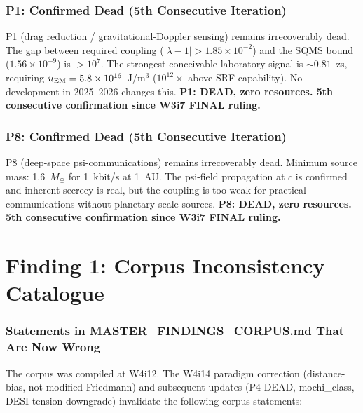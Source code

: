 \documentclass[11pt]{article}
\newcommand{\ee}[1]{\times 10^{#1}}
\newcommand{\lamdiff}{|\lambda{-}1|}
\begin{document}
\section{P1: Confirmed Dead (5th Consecutive Iteration)}

P1 (drag reduction / gravitational-Doppler sensing) remains irrecoverably
dead.  The gap between required coupling ($\lamdiff > 1.85\ee{-2}$) and
the SQMS bound ($1.56\ee{-9}$) is $>10^7$.  The strongest conceivable
laboratory signal is $\sim 0.81$~zs, requiring $u_{\rm EM} = 5.8\ee{16}$~J/m$^3$
($10^{12}\times$ above SRF capability).  No development in 2025--2026
changes this.  \textbf{P1: DEAD, zero resources.  5th consecutive
confirmation since W3i7 FINAL ruling.}

\section{P8: Confirmed Dead (5th Consecutive Iteration)}

P8 (deep-space psi-communications) remains irrecoverably dead.
Minimum source mass: 1.6~$M_\oplus$ for 1~kbit/s at 1~AU.  The
psi-field propagation at $c$ is confirmed and inherent secrecy is
real, but the coupling is too weak for practical communications without
planetary-scale sources.  \textbf{P8: DEAD, zero resources.  5th
consecutive confirmation since W3i7 FINAL ruling.}


\part{Finding 1: Corpus Inconsistency Catalogue}
\label{sec:corpus}

\section{Statements in MASTER\_FINDINGS\_CORPUS.md That Are Now Wrong}

The corpus was compiled at W4i12.  The W4i14 paradigm correction
(distance-bias, not modified-Friedmann) and subsequent updates
(P4 DEAD, mochi\_class, DESI tension downgrade) invalidate
the following corpus statements:
\end{document}

